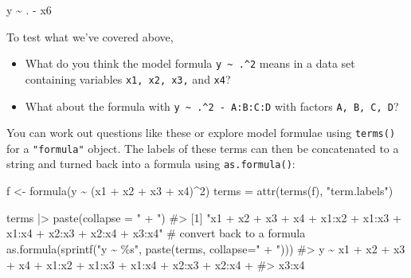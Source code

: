 \documentclass[
  letterpaper,
  10pt,
  krantz2]{krantz}
\makeatletter
\newenvironment{Shaded}{\begin{snugshade}}{\end{snugshade}}
\newcommand{\AttributeTok}[1]{\textcolor[rgb]{0.40,0.45,0.13}{#1}}
\newcommand{\CommentTok}[1]{\textcolor[rgb]{0.37,0.37,0.37}{#1}}
\newcommand{\DecValTok}[1]{\textcolor[rgb]{0.68,0.00,0.00}{#1}}
\newcommand{\FunctionTok}[1]{\textcolor[rgb]{0.28,0.35,0.67}{#1}}
\newcommand{\NormalTok}[1]{\textcolor[rgb]{0.00,0.23,0.31}{#1}}
\newcommand{\OtherTok}[1]{\textcolor[rgb]{0.00,0.23,0.31}{#1}}
\newcommand{\SpecialCharTok}[1]{\textcolor[rgb]{0.37,0.37,0.37}{#1}}
\newcommand{\StringTok}[1]{\textcolor[rgb]{0.13,0.47,0.30}{#1}}
\newenvironment{kframe}{%
  \medskip{}
  \setlength{\fboxsep}{.8em}
  \def\at@end@of@kframe{}%
  \ifinner\ifhmode%
  \def\at@end@of@kframe{\end{minipage}}%
  \begin{minipage}{\columnwidth}%
  \fi\fi%
  \def\FrameCommand##1{\hskip\@totalleftmargin \hskip-\fboxsep
  \colorbox{shadecolor}{##1}\hskip-\fboxsep
      \hskip-\linewidth \hskip-\@totalleftmargin \hskip\columnwidth}%
  \MakeFramed {\advance\hsize-\width
    \@totalleftmargin\z@ \linewidth\hsize
    \@setminipage}}%
{\par\unskip\endMakeFramed%
  \at@end@of@kframe}
\renewenvironment{Shaded}{\begin{kframe}}{\end{kframe}}
\makeatother
\begin{document}
\begin{Shaded}
\begin{Highlighting}[]
\NormalTok{y }\SpecialCharTok{\textasciitilde{}}\NormalTok{ . }\SpecialCharTok{{-}}\NormalTok{ x6}
\end{Highlighting}
\end{Shaded}

To test what we've covered above,

\begin{itemize}
\item
  What do you think the model formula
  \texttt{y\ \textasciitilde{}\ .\^{}2} means in a data set containing
  variables \texttt{x1,\ x2,\ x3,} and \texttt{x4}?
\item
  What about the formula with
  \texttt{y\ \textasciitilde{}\ .\^{}2\ -\ A:B:C:D} with factors
  \texttt{A,\ B,\ C,\ D}?
\end{itemize}

You can work out questions like these or explore model formulae using
\texttt{terms()} for a \texttt{"formula"} object. The labels of these
terms can then be concatenated to a string and turned back into a
formula using \texttt{as.formula()}:

\begin{Shaded}
\begin{Highlighting}[]
\NormalTok{f }\OtherTok{\textless{}{-}} \FunctionTok{formula}\NormalTok{(y }\SpecialCharTok{\textasciitilde{}}\NormalTok{ (x1 }\SpecialCharTok{+}\NormalTok{ x2 }\SpecialCharTok{+}\NormalTok{ x3 }\SpecialCharTok{+}\NormalTok{ x4)}\SpecialCharTok{\^{}}\DecValTok{2}\NormalTok{)}
\NormalTok{terms }\OtherTok{=} \FunctionTok{attr}\NormalTok{(}\FunctionTok{terms}\NormalTok{(f), }\StringTok{"term.labels"}\NormalTok{)}

\NormalTok{terms }\SpecialCharTok{|\textgreater{}} \FunctionTok{paste}\NormalTok{(}\AttributeTok{collapse =} \StringTok{" + "}\NormalTok{)}
\CommentTok{\#\textgreater{} [1] "x1 + x2 + x3 + x4 + x1:x2 + x1:x3 + x1:x4 + x2:x3 + x2:x4 + x3:x4"}
\CommentTok{\# convert back to a formula}
\FunctionTok{as.formula}\NormalTok{(}\FunctionTok{sprintf}\NormalTok{(}\StringTok{"y \textasciitilde{} \%s"}\NormalTok{, }\FunctionTok{paste}\NormalTok{(terms, }\AttributeTok{collapse=}\StringTok{" + "}\NormalTok{))) }
\CommentTok{\#\textgreater{} y \textasciitilde{} x1 + x2 + x3 + x4 + x1:x2 + x1:x3 + x1:x4 + x2:x3 + x2:x4 + }
\CommentTok{\#\textgreater{}     x3:x4}
\end{Highlighting}
\end{Shaded}
\end{document}
